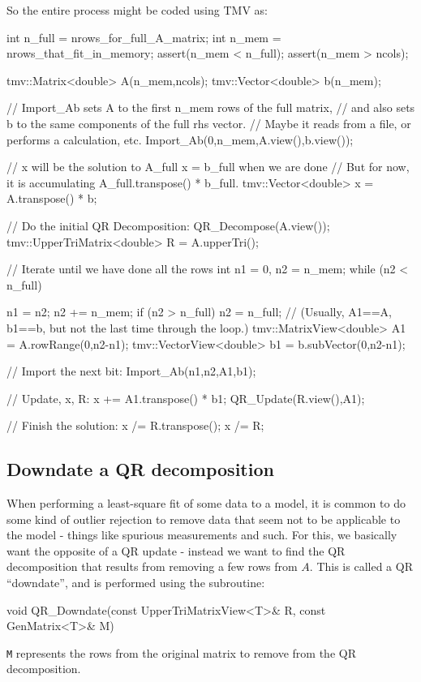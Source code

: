 \documentclass[twoside,letterpaper,11pt]{article}
\renewcommand{\tt}[1]{{\lstinline {#1}}}
\begin{document}
So the entire process might be coded using TMV as:
\begin{tmvcode}
int n_full = nrows_for_full_A_matrix;
int n_mem = nrows_that_fit_in_memory;
assert(n_mem < n_full);
assert(n_mem > ncols);

tmv::Matrix<double> A(n_mem,ncols); 
tmv::Vector<double> b(n_mem);

// Import_Ab sets A to the first n_mem rows of the full matrix, 
// and also sets b to the same components of the full rhs vector.
// Maybe it reads from a file, or performs a calculation, etc.
Import_Ab(0,n_mem,A.view(),b.view());

// x will be the solution to A_full x = b_full when we are done
// But for now, it is accumulating A_full.transpose() * b_full.
tmv::Vector<double> x = A.transpose() * b;

// Do the initial QR Decomposition:
QR_Decompose(A.view());
tmv::UpperTriMatrix<double> R = A.upperTri();

// Iterate until we have done all the rows
int n1 = 0, n2 = n_mem;
while (n2 < n_full) 
{
    n1 = n2; n2 += n_mem;
    if (n2 > n_full) n2 = n_full;
    // (Usually, A1==A, b1==b, but not the last time through the loop.)
    tmv::MatrixView<double> A1 = A.rowRange(0,n2-n1);
    tmv::VectorView<double> b1 = b.subVector(0,n2-n1);

    // Import the next bit:
    Import_Ab(n1,n2,A1,b1);

    // Update, x, R:
    x += A1.transpose() * b1;
    QR_Update(R.view(),A1);
}

// Finish the solution:
x /= R.transpose();
x /= R;
\end{tmvcode}

\subsection{Downdate a QR decomposition}
\label{downdate}

When performing a least-square fit of some data to a model,
it is common to do some kind of outlier rejection to remove data that
seem not to be applicable to the model - things like spurious measurements
and such.
For this, we basically want the opposite of a QR update - instead we want to 
find the QR decomposition that results from
removing a few rows from $A$.  This is called a QR ``downdate'', and is performed
using the subroutine:
\begin{tmvcode}
void QR_Downdate(const UpperTriMatrixView<T>& R, const GenMatrix<T>& M)
\end{tmvcode}
\tt{M} represents the rows from the original matrix to remove from the 
QR decomposition.
\end{document}
